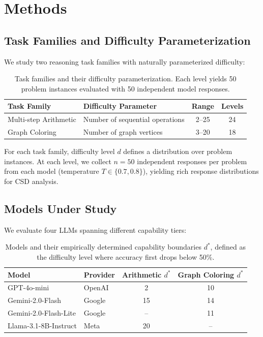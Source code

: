 \documentclass[11pt,letterpaper]{article}
\begin{document}
\section{Methods}

\subsection{Task Families and Difficulty Parameterization}

We study two reasoning task families with naturally parameterized difficulty:

\begin{table}[!htbp]
\centering
\caption{Task families and their difficulty parameterization. Each level yields 50 problem instances evaluated with 50 independent model responses.}
\label{tab:tasks}
\begin{tabular}{llcc}
\toprule
\textbf{Task Family} & \textbf{Difficulty Parameter} & \textbf{Range} & \textbf{Levels} \\
\midrule
Multi-step Arithmetic & Number of sequential operations & 2--25 & 24 \\
Graph Coloring & Number of graph vertices & 3--20 & 18 \\
\bottomrule
\end{tabular}
\end{table}

For each task family, difficulty level $d$ defines a distribution over problem instances. At each level, we collect $n = 50$ independent responses per problem from each model (temperature $T \in \{0.7, 0.8\}$), yielding rich response distributions for CSD analysis.

\subsection{Models Under Study}

We evaluate four LLMs spanning different capability tiers:

\begin{table}[!htbp]
\centering
\caption{Models and their empirically determined capability boundaries $d^*$, defined as the difficulty level where accuracy first drops below 50\%.}
\label{tab:models}
\begin{tabular}{llcc}
\toprule
\textbf{Model} & \textbf{Provider} & \textbf{Arithmetic $d^*$} & \textbf{Graph Coloring $d^*$} \\
\midrule
GPT-4o-mini & OpenAI & 2 & 10 \\
Gemini-2.0-Flash & Google & 15 & 14 \\
Gemini-2.0-Flash-Lite & Google & -- & 11 \\
Llama-3.1-8B-Instruct & Meta & 20 & -- \\
\bottomrule
\end{tabular}
\end{table}
\end{document}
